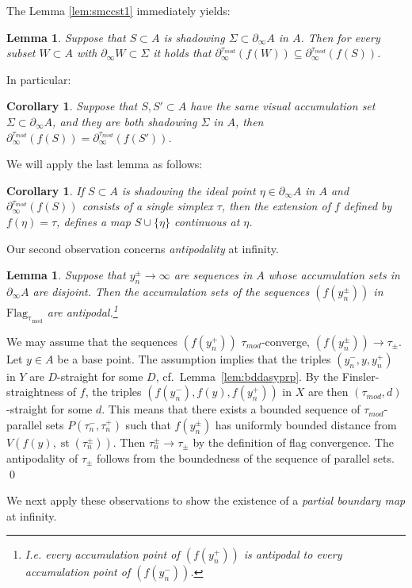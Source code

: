 \documentclass[12pt]{article}
\theoremstyle{boldplain}
\newtheorem{cor}[equation]{Corollary}
\newtheorem{lem}[equation]{Lemma}
\theoremstyle{bolddefinition}
\numberwithin{equation}{section}
\def\Si{\Sigma}
\def\Flagt{\operatorname{Flag_{\tau_{mod}}}}
\def\geo{\partial_{\infty}}
\def\geot{\partial_{\infty}^{\tau_{mod}}}
\def\st{\operatorname{st}}
\def\taumod{\tau_{mod}}
\def\mini{\scriptsize}
\begin{document}
The Lemma \ref{lem:smccst1} immediately yields:
\begin{lem}
\label{lem:smccst}
Suppose that $S\subset A$ is shadowing $\Si\subset\geo A$ in $A$.
Then for every 
subset $W\subset A$ with $\geo W\subset\Si$ it holds that $\geot(f(W))\subseteq\geot (f(S))$. 
\end{lem}
In particular:
\begin{cor}
\label{cor:dffsbshsp}
Suppose that $S,S'\subset A$ have the same visual accumulation set $\Si\subset\geo A$, 
and they are both shadowing $\Si$ in $A$,
then $\geot(f(S))=\geot (f(S'))$. 
\end{cor}

We will apply the last lemma as follows:

\begin{cor}
\label{cor:smccst}
If $S\subset A$ is shadowing the ideal point $\eta\in\geo A$ in $A$
and $\geot (f(S))$ consists of a single simplex $\tau$,
then {the extension of $f$ defined by $f(\eta)=\tau$, defines a map $S\cup \{\eta\}$ continuous at $\eta$}. 
\end{cor}

Our second observation concerns {\em antipodality} at infinity.

\begin{lem}
\label{lem:ntpdccst}
Suppose that $y^{\pm}_n\to\infty$ are sequences in $A$ 
whose accumulation sets in $\geo A$ are disjoint. 
Then the accumulation sets of the sequences $(f(y^{\pm}_n))$ 
in $\Flagt$ are antipodal.\footnote{I.e.
every accumulation point of $(f(y^+_n))$ is antipodal to every accumulation point of $(f(y^-_n))$.}
\end{lem}
\proof
We may assume that the sequences $(f(y^+_n))$ $\taumod$-converge, $(f(y^\pm_n))\to\tau_{\pm}$.
Let $y\in A$ be a base point. 
The assumption implies that the triples $(y^-_n,y,y^+_n)$ in $Y$ are $D$-straight for some $D$,
cf.\ Lemma~\ref{lem:bddasyprp}.
By the Finsler-straightness of $f$,
the triples $(f(y^-_n),f(y),f(y^+_n))$ in $X$ are then 
$(\taumod,d)$-straight for some $d$.
This means that there exists a bounded sequence of $\taumod$-parallel sets $P(\tau^-_n,\tau^+_n)$
such that $f(y^{\pm}_n)$ has uniformly bounded distance from $V(f(y),\st(\tau^{\pm}_n))$.
Then $\tau^{\pm}_n\to\tau_{\pm}$ by the definition of flag convergence.
The antipodality of $\tau_{\pm}$ follows from the boundedness of the sequence of parallel sets.
\qed


\medskip 
We next apply these observations to show the existence of a {\em partial boundary map} at infinity.
\end{document}
